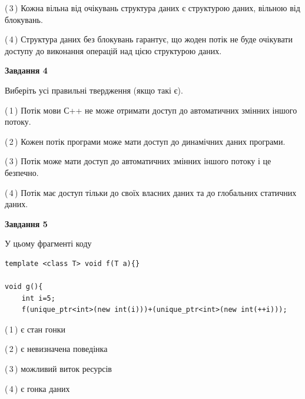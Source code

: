 \documentclass[12pt, ukrainian]{article}
\begin{document}
\begin {large}
{(\,3\,) Кожна вільна від очікувань структура даних є структурою даних, вільною від блокувань.%

(\,4\,) Структура даних без блокувань гарантує, що жоден потік не буде очікувати доступу до виконання операцій над цією структурою даних.%



\begin{center}
\textbf{Завдання 4}
\end{center}
Виберіть усі правильні твердження (якщо такі є).\par
\vspace{2mm}

(\,1\,) Потік мови С++ не може отримати доступ до автоматичних змінних іншого потоку.%

(\,2\,) Кожен потік програми може мати доступ до динамічних даних програми.%

(\,3\,) Потік може мати доступ до автоматичних змінних іншого потоку і це безпечно.%

(\,4\,) Потік має доступ тільки до своїх власних даних та до глобальних статичних даних.%



\begin{center}
\textbf{Завдання 5}
\end{center}
У цьому фрагменті коду
\begin{verbatim}
template <class T> void f(T a){}

void g(){
    int i=5;
    f(unique_ptr<int>(new int(i)))+(unique_ptr<int>(new int(++i)));
\end{verbatim}
(\,1\,) є стан гонки%

(\,2\,) є невизначена поведінка%

(\,3\,) можливий виток ресурсів%

(\,4\,) є гонка даних%


}
\end {large}
\end{document}
